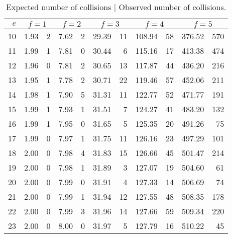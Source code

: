 \def\eps  {$\quad\epsilon\quad$}
\def\epsm  {$\quad 1 - \epsilon\quad$}


\begin {table}
\centering
\caption {Expected number of
collisions | Observed number of collisions.}
\label {tab:coll1}
\smallskip
\begin {tabular}{|r|@{\extracolsep{10pt}}rr|rr|rr|rr|rr|}
\hline
 $e$& \multicolumn{2}{c|}{$  f=1$} & \multicolumn{2}{c|}{$  f=2$} & \multicolumn{2}{c|}{$  f=3$} & \multicolumn{2}{c|}{$  f=4
$} & \multicolumn{2}{c|}{$  f=5$}  \\
\hline
 10 &     1.93 &     2 &     7.62 &     2 &    29.39 &    11 &   108.94 &    58 &   376.52 &   570 \\
 11 &     1.99 &     1 &     7.81 &     0 &    30.44 &     6 &   115.16 &    17 &   413.38 &   474 \\
 12 &     1.96 &     0 &     7.81 &     2 &    30.65 &    13 &   117.87 &    44 &   436.20 &   216 \\
 13 &     1.95 &     1 &     7.78 &     2 &    30.71 &    22 &   119.46 &    57 &   452.06 &   211 \\
 14 &     1.98 &     1 &     7.90 &     5 &    31.31 &    11 &   122.77 &    52 &   471.77 &   191 \\
 15 &     1.99 &     1 &     7.93 &     1 &    31.51 &     7 &   124.27 &    41 &   483.20 &   132 \\
 16 &     1.99 &     1 &     7.95 &     0 &    31.65 &     5 &   125.35 &    20 &   491.26 &    75 \\
 17 &     1.99 &     0 &     7.97 &     1 &    31.75 &    11 &   126.16 &    23 &   497.29 &   101 \\
 18 &     2.00 &     0 &     7.98 &     4 &    31.83 &    15 &   126.66 &    45 &   501.47 &   214 \\
 19 &     2.00 &     0 &     7.98 &     1 &    31.89 &     3 &   127.07 &    19 &   504.60 &    61 \\
 20 &     2.00 &     0 &     7.99 &     0 &    31.91 &     4 &   127.33 &    14 &   506.69 &    74 \\
 21 &     2.00 &     0 &     7.99 &     1 &    31.94 &    12 &   127.55 &    48 &   508.35 &   178 \\
 22 &     2.00 &     0 &     7.99 &     3 &    31.96 &    14 &   127.66 &    59 &   509.34 &   220 \\
 23 &     2.00 &     0 &     8.00 &     0 &    31.97 &     5 &   127.79 &    16 &   510.22 &    45 \\

\end{tabular}
\end{table}
